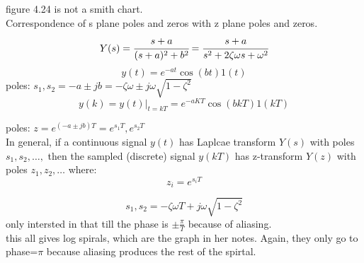 \documentclass{article}
\begin{document}
figure 4.24 is not a smith chart.\\


Correspondence of s plane poles and zeros with z plane poles and zeros.
\[Y(s)=\cfrac{s+a}{(s+a)^2+b^2}=\cfrac{s+a}{s^2+2\zeta\omega s+\omega^2}\]
\[y(t)=e^{-at}\cos(bt)1(t)\]
poles: $s_1,s_2=-a\pm jb=-\zeta\omega\pm j\omega\sqrt{1-\zeta^2}$
\[y(k)=y(t)\bigg|_{t=kT}=e^{-aKT}\cos(bkT)1(kT)\]

poles: $z=e^{(-a\pm jb)T}=e^{s_1T}, e^{s_2T}$\\
In general, if a continuous signal $y(t)$ has Laplcae transform $Y(s)$ with poles $s_1,s_2,\dots,$ then the sampled (discrete) signal $y(kT)$ has z-transform $Y(z)$ with poles $z_1,z_2,\dots$ where:
\[z_i=e^{s_iT}\]

\[s_1,s_2=-\zeta\omega T+j\omega\sqrt{1-\zeta^2}\]
only intersted in that till the phase is $\pm \frac{\pi}{T}$ because of aliasing.\\
this all gives log spirals, which are the graph in her notes. Again, they only go to phase=$\pi$ because aliasing produces the rest of the spirtal.
\end{document}
